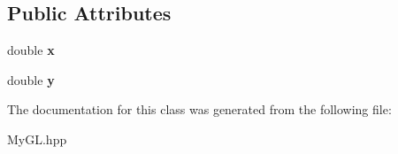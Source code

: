 \subsection*{Public Attributes}
\begin{DoxyCompactItemize}
\item 
double {\bfseries x}\hypertarget{classCursorMovement_ac77861debf3dc2013b7ee0f6775b6540}{}\label{classCursorMovement_ac77861debf3dc2013b7ee0f6775b6540}

\item 
double {\bfseries y}\hypertarget{classCursorMovement_afab93e8fcc9f845fdcf6fffdf9232cab}{}\label{classCursorMovement_afab93e8fcc9f845fdcf6fffdf9232cab}

\end{DoxyCompactItemize}


The documentation for this class was generated from the following file\+:\begin{DoxyCompactItemize}
\item 
My\+G\+L.\+hpp\end{DoxyCompactItemize}
